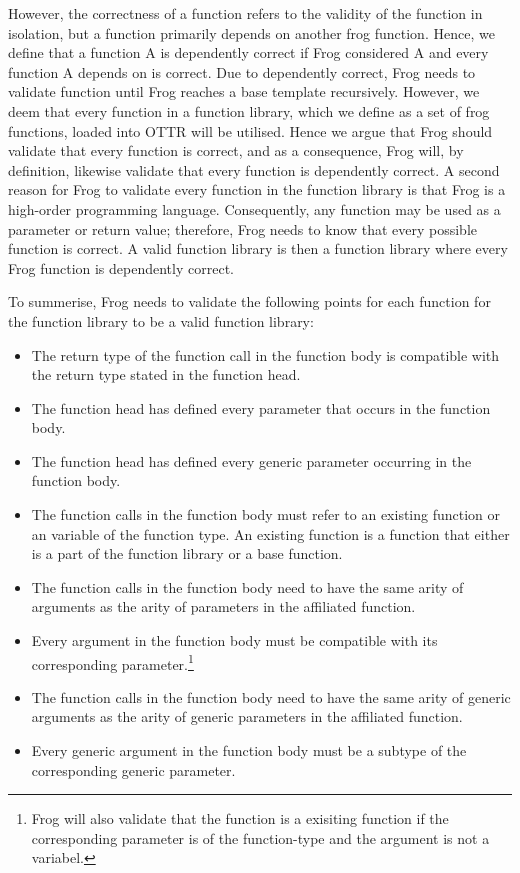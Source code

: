 \para 
However, the correctness of a function refers to the validity of the function in isolation, but a function primarily depends on another frog function. Hence, we define that a function A is dependently correct if Frog considered  A and every function A depends on is correct. Due to dependently correct, Frog needs to validate function until Frog reaches a base template recursively. However, we deem that every function in a function library, which we define as a set of frog functions, loaded into OTTR will be utilised. Hence we argue that Frog should validate that every function is correct, and as a consequence, Frog will, by definition, likewise validate that every function is dependently correct. A second reason for Frog to validate every function in the function library is that Frog is a high-order programming language. Consequently, any function may be used as a parameter or return value; therefore, Frog needs to know that every possible function is correct. A valid function library is then a function library where every Frog function is dependently correct.

\para
To summerise, Frog needs to validate the following points for each function for the function library to be a valid function library: 
\begin{itemize}
    \item The return type of the function call in the function body is compatible with the return type stated in the function head. 
    \item The function head has defined every parameter that occurs in the function body.
    \item The function head has defined every generic parameter occurring in the function body.
    \item The function calls in the function body must refer to an existing function or an variable of the function type. An existing function is a function that either is a part of the function library or a base function. 
    \item The function calls in the function body need to have the same arity of arguments as the arity of parameters in the affiliated function.
    \item Every argument in the function body must be compatible with its corresponding parameter.\footnote{Frog will also validate that the function is a exisiting function if the corresponding parameter is of the function-type and the argument is not a variabel. } 
    \item The function calls in the function body need to have the same arity of generic arguments as the arity of generic parameters in the affiliated function.
    \item Every generic argument in the function body must be a subtype of the corresponding generic parameter. 
\end{itemize}

